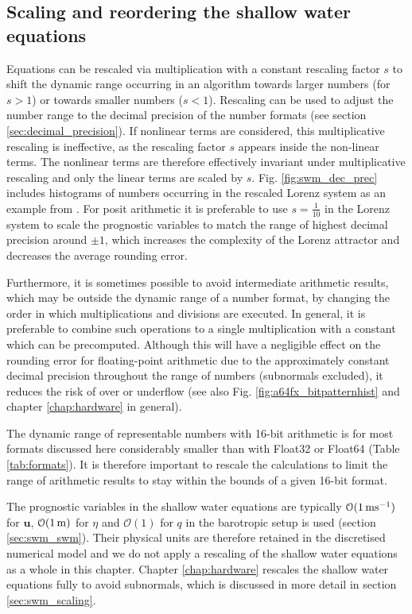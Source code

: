 \subsection{Scaling and reordering the shallow water equations}
\label{sec:swm_scale}

Equations can be rescaled via multiplication with a constant rescaling factor $s$ to shift the dynamic range occurring in an algorithm
towards larger numbers (for $s > 1$) or towards smaller numbers ($s < 1$). Rescaling can be used to adjust the number range to the
decimal precision of the number formats (see section \ref{sec:decimal_precision}). If nonlinear terms are considered, this multiplicative
rescaling is ineffective, as the rescaling factor $s$ appears inside the non-linear terms. The nonlinear terms are therefore effectively
invariant under multiplicative rescaling and only the linear terms are scaled by $s$. Fig. \ref{fig:swm_dec_prec} includes histograms of
numbers occurring in the rescaled Lorenz system \citep{Lorenz1963,Kwasniok2014,Jeffress2017,Tantet2018} as an example
from \cite{Klower2019a}. For posit arithmetic it is preferable to use $s=\tfrac{1}{10}$ in the Lorenz system to scale the prognostic
variables to match the range of highest decimal precision around $\pm1$, which increases the complexity of the Lorenz attractor
and decreases the average rounding error.

Furthermore, it is sometimes possible to avoid intermediate arithmetic results, which may be outside the dynamic range of a number format,
by changing the order in which multiplications and divisions are executed. In general, it is preferable to combine such operations to a single
multiplication with a constant which can be precomputed. Although this will have a negligible effect on the rounding error for floating-point
arithmetic due to the approximately constant decimal precision throughout the range of numbers (subnormals excluded), it reduces the risk
of over or underflow (see also Fig. \ref{fig:a64fx_bitpatternhist} and chapter \ref{chap:hardware} in general).

The dynamic range of representable numbers with 16-bit arithmetic is for most formats discussed here considerably smaller than with
Float32 or Float64 (Table \ref{tab:formats}). It is therefore important to rescale the calculations to limit the range of arithmetic results to
stay within the bounds of a given 16-bit format.

The prognostic variables in the shallow water equations are typically $\mathcal{O}(1\operatorname{ms}^{-1})$ for $\mathbf{u}$, $\mathcal{O}(1\operatorname{m})$
for $\eta$ and $\mathcal{O}(1)$ for $q$ in the barotropic setup is used (section \ref{sec:swm_swm}). Their physical units are therefore retained
in the discretised numerical model and we do not apply a rescaling of the shallow water equations as a whole in this chapter. Chapter
\ref{chap:hardware} rescales the shallow water equations fully to avoid subnormals, which is discussed in more detail in section
\ref{sec:swm_scaling}.

